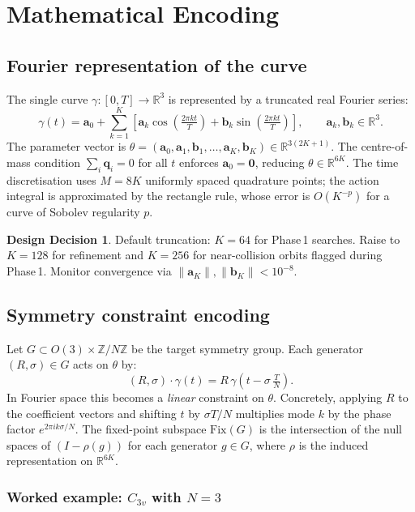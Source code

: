 \documentclass[12pt, a4paper]{article}
\theoremstyle{definition}
\newtheorem{decision}{Design Decision}
\newcommand{\R}{\mathbb{R}}
\newcommand{\Z}{\mathbb{Z}}
\newcommand{\Fix}{\mathrm{Fix}}
\newcommand{\bfq}{\mathbf{q}}
\newcommand{\bfa}{\mathbf{a}}
\newcommand{\bfb}{\mathbf{b}}
\begin{document}
\section{Mathematical Encoding}

\subsection{Fourier representation of the curve}

The single curve $\gamma : [0,T] \to \R^3$ is represented by a truncated
real Fourier series:
\[
  \gamma(t) = \bfa_0
  + \sum_{k=1}^{K} \!\left[
      \bfa_k \cos\!\left(\tfrac{2\pi k t}{T}\right)
    + \bfb_k \sin\!\left(\tfrac{2\pi k t}{T}\right)
  \right],
  \qquad \bfa_k, \bfb_k \in \R^3.
\]
The parameter vector is $\theta = (\bfa_0, \bfa_1, \bfb_1, \ldots,
\bfa_K, \bfb_K) \in \R^{3(2K+1)}$.  The centre-of-mass condition
$\sum_i \bfq_i = 0$ for all $t$ enforces $\bfa_0 = \mathbf{0}$, reducing
$\theta \in \R^{6K}$.  The time discretisation uses $M = 8K$ uniformly spaced
quadrature points; the action integral is approximated by the rectangle rule,
whose error is $O(K^{-p})$ for a curve of Sobolev regularity $p$.

\begin{decision}
Default truncation: $K = 64$ for Phase\,1 searches.  Raise to $K = 128$
for refinement and $K = 256$ for near-collision orbits flagged during Phase\,1.
Monitor convergence via $\|\bfa_K\|, \|\bfb_K\| < 10^{-8}$.
\end{decision}

\subsection{Symmetry constraint encoding}

Let $G \subset O(3) \times \Z/N\Z$ be the target symmetry group.  Each
generator $(R, \sigma) \in G$ acts on $\theta$ by:
\[
  (R,\sigma) \cdot \gamma(t) = R\,\gamma\!\left(t - \sigma\,\tfrac{T}{N}\right).
\]
In Fourier space this becomes a \emph{linear} constraint on $\theta$.
Concretely, applying $R$ to the coefficient vectors and shifting $t$ by
$\sigma T/N$ multiplies mode $k$ by the phase factor $e^{2\pi i k \sigma/N}$.
The fixed-point subspace $\Fix(G)$ is the intersection of the null spaces of
$(I - \rho(g))$ for each generator $g \in G$, where $\rho$ is the induced
representation on $\R^{6K}$.

\subsubsection{Worked example: $C_{3v}$ with $N = 3$}
\end{document}
